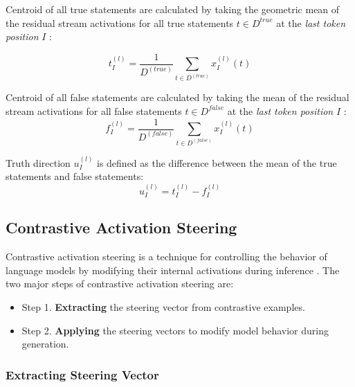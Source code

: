 \documentclass[]{paper}
\begin{document}
Centroid of all true statements are calculated by taking the geometric mean of the residual stream activations for all true statements \( t \in D^{true} \) at the \textit{last token position }\(I\) :

\begin{equation} \label{eq:centroid_true}
{t}_{I}^{(l)} = \frac{1}{D^{(true)}} \sum_{t \in D^{(true)}} {x}_{I}^{(l)} (t) 
\end{equation}

Centroid of all false statements are calculated by taking the  mean of the residual stream activations for all false statements \( t \in D^{false} \) at the \textit{last token position }\(I\) :
\begin{equation} \label{eq:centroid_false}
{f}_{I}^{(l)} = \frac{1}{D^{(false)}} \sum_{t \in D^{(false)}} {x}_{I}^{(l)} (t)
\end{equation} 

Truth direction \({u}_{I}^{(l)}\) is defined as the difference between the mean of the true statements and false statements:
\begin{equation} \label{eq:truth_direction}
{u}_{I}^{(l)}  = {t}_{I}^{(l)} - {f}_{I}^{(l)} 
\end{equation} 

\subsection{Contrastive Activation Steering} \label{method:steering}

Contrastive activation steering is a technique for controlling the behavior of language models by modifying their internal activations during inference \citep{turnerActivationAdditionSteering2024, arditiRefusalLanguageModels2024,rimskySteeringLlamaContrastive2024}. The two major steps of contrastive activation steering are:

\begin{itemize}
    \item Step 1. \textbf{Extracting} the steering vector from contrastive examples.
    \item Step 2. \textbf{Applying} the steering vectors to modify model behavior during generation.
\end{itemize}


\subsubsection{Extracting Steering Vector}
\label{sec:steering}
\end{document}
